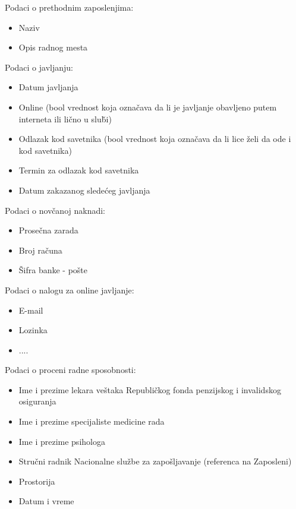 \noindent Podaci o prethodnim zaposlenjima:
\begin{itemize}
	\item Naziv
	\item Opis radnog mesta
\end{itemize}

\noindent Podaci o javljanju:
\begin{itemize}
	\item Datum javljanja
	\item Online (bool vrednost koja ozna\v cava da li je javljanje obavljeno putem interneta ili li\v cno u slu\v bi)
	\item Odlazak kod savetnika (bool vrednost koja ozna\v cava da li lice \v zeli da ode i kod savetnika)
	\item Termin za odlazak kod savetnika
	\item Datum zakazanog slede\' ceg javljanja
\end{itemize}

\noindent Podaci o nov\v canoj naknadi:
\begin{itemize}
	\item Prose\v cna zarada
	\item Broj ra\v cuna
	\item \v Sifra banke - po\v ste
\end{itemize}

\noindent Podaci o nalogu za online javljanje:
\begin{itemize}
	\item E-mail
	\item Lozinka
	\item ....
\end{itemize}

\noindent Podaci o proceni radne sposobnosti:
\begin{itemize}
	\item Ime i prezime lekara veštaka Republi\v ckog fonda penzijskog i invalidskog osiguranja
	\item Ime i prezime specijaliste medicine rada
	\item Ime i prezime psihologa
	\item Stru\v cni radnik Nacionalne slu\v zbe za zapo\v sljavanje (referenca na Zaposleni)
	\item Prostorija
	\item Datum i vreme
\end{itemize}


